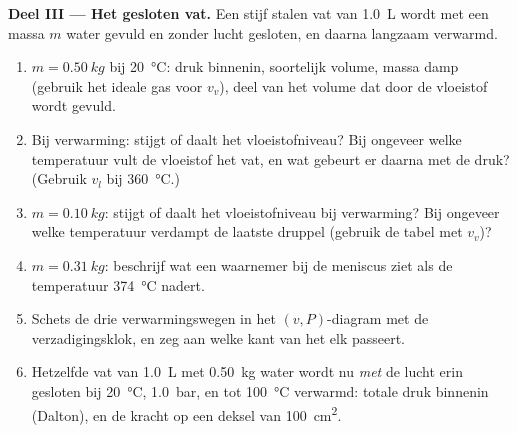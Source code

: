 \begin{problem}
\medskip
\noindent\textbf{Deel III --- Het gesloten vat.}
Een stijf stalen vat van \qty{1.0}{L} wordt met een massa $m$ water
gevuld en zonder lucht gesloten, en daarna langzaam verwarmd.
\begin{enumerate}[resume]
  \item $m = \qty{0.50}{kg}$ bij \qty{20}{\degreeCelsius}: druk binnenin,
        soortelijk volume, massa damp (gebruik het ideale gas voor $v_v$),
        deel van het volume dat door de vloeistof wordt gevuld.
  \item Bij verwarming: stijgt of daalt het vloeistofniveau? Bij ongeveer welke
        temperatuur vult de vloeistof het vat, en wat gebeurt er daarna met
        de druk? (Gebruik $v_l$ bij \qty{360}{\degreeCelsius}.)
  \item $m = \qty{0.10}{kg}$: stijgt of daalt het vloeistofniveau bij
        verwarming? Bij ongeveer welke temperatuur verdampt de laatste
        druppel (gebruik de tabel met $v_v$)?
  \item $m = \qty{0.31}{kg}$: beschrijf wat een waarnemer bij de
        meniscus ziet als de temperatuur \qty{374}{\degreeCelsius} nadert.
  \item Schets de drie verwarmingswegen in het $(v, P)$-diagram met de
        verzadigingsklok, en zeg aan welke kant van het  elk
        passeert.
  \item Hetzelfde vat van \qty{1.0}{L} met \qty{0.50}{kg} water wordt nu
        \emph{met} de lucht erin gesloten bij \qty{20}{\degreeCelsius},
        \qty{1.0}{bar}, en tot \qty{100}{\degreeCelsius} verwarmd: totale
        druk binnenin (Dalton), en de kracht op een deksel van \qty{100}{cm^2}.
\end{enumerate}


\end{problem}
